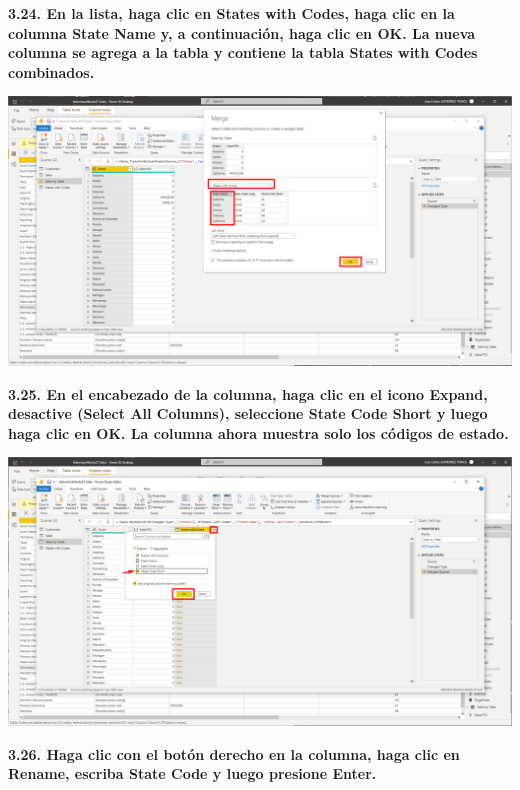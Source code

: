 \documentclass{article}
\begin{document}
\textbf{3.24. En la lista, haga clic en \textbf{States with Codes}, haga clic en la columna \textbf{State Name} y, a continuación, haga clic en \textbf{OK}. La nueva columna se agrega a la tabla y contiene la tabla \textbf{States with Codes} combinados.}

    \begin{center}
		\includegraphics[width=14cm]{./images/72} 
	\end{center}
\newpage
\textbf{3.25. En el encabezado de la columna, haga clic en el icono \textbf{Expand}, desactive \textbf{(Select All Columns)}, seleccione \textbf{State Code Short} y luego haga clic en \textbf{OK}. La columna ahora muestra solo los códigos de estado.}

    \begin{center}
		\includegraphics[width=14cm]{./images/73} 
	\end{center}

\textbf{3.26. Haga clic con el botón derecho en la columna, haga clic en \textbf{Rename}, escriba \textbf{State Code} y luego presione Enter.}
\end{document}
